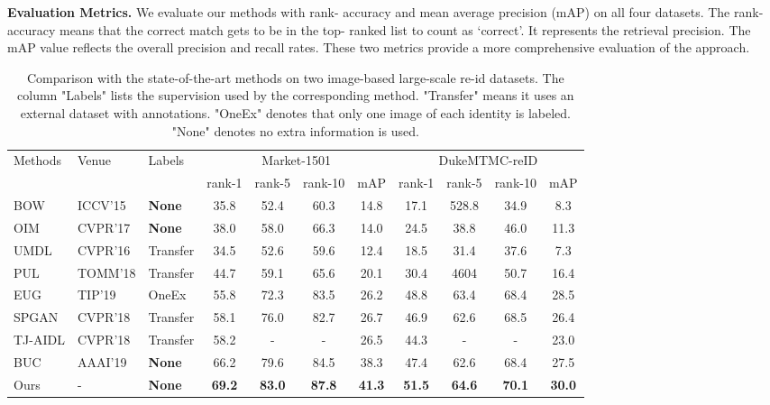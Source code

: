 \documentclass[journal]{IEEEtran}
\begin{document}
\textbf{Evaluation Metrics.} 
We evaluate our methods with rank- accuracy and mean average precision (mAP) on all four datasets. The rank- accuracy means that the correct match gets to be in the top- ranked list to count as `correct'. It represents the retrieval precision. The mAP value reflects the overall precision and recall rates. These two metrics provide a more comprehensive evaluation of the approach.

\begin{table*}[htb]
\caption{Comparison with the state-of-the-art methods on two image-based large-scale re-id datasets. The column "Labels" lists the supervision used by the corresponding method. "Transfer" means it uses an external dataset with annotations. "OneEx" denotes that only one image of each identity is labeled. "None" denotes no extra information is used.}
\begin{center}
\label{tab:market_duke}

\begin{tabular}{l|l|l|cccc|cccc}
\hline
\multirow{2}{*}{Methods} & \multirow{2}{*}{Venue} &\multirow{2}{*}{Labels}& \multicolumn{4}{c|}{Market-1501} & \multicolumn{4}{c}{DukeMTMC-reID} \\\cline{4-11}
 & & & rank-1 & rank-5 & rank-10 & mAP & rank-1 & rank-5 & rank-10 & mAP \\\hline
BOW\cite{zheng2015scalable} & ICCV'15 & \textbf{None} & 35.8 & 52.4 & 60.3 & 14.8 & 17.1 & 528.8 & 34.9 & 8.3 \\
OIM\cite{xiao2017joint}  & CVPR'17 & \textbf{None} & 38.0 & 58.0 & 66.3 & 14.0 & 24.5 & 38.8 & 46.0 & 11.3 \\
UMDL\cite{peng2016unsupervised} & CVPR'16 & Transfer & 34.5 & 52.6 & 59.6 & 12.4 & 18.5 & 31.4 & 37.6 & 7.3 \\
PUL\cite{fan2018unsupervised} & TOMM'18 & Transfer & 44.7 & 59.1 & 65.6 & 20.1 & 30.4 & 4604 & 50.7 & 16.4 \\
EUG\cite{wu2019progressive} & TIP'19 & OneEx & 55.8 & 72.3 & 83.5 & 26.2 & 48.8 & 63.4 & 68.4 & 28.5 \\
SPGAN\cite{deng2018image} & CVPR'18 & Transfer & 58.1 & 76.0 & 82.7 & 26.7 & 46.9 & 62.6 & 68.5 & 26.4 \\
TJ-AIDL\cite{wang2018transferable} & CVPR'18 & Transfer & 58.2 & - & - & 26.5 & 44.3 & - & - & 23.0 \\
BUC\cite{lin2019bottom} & AAAI'19 & \textbf{None} & 66.2 & 79.6 & 84.5 & 38.3 & 47.4 & 62.6 & 68.4 & 27.5 \\\hline
Ours & - & \textbf{None} & \textbf{69.2} & \textbf{83.0} & \textbf{87.8} & \textbf{41.3} & \textbf{51.5} & \textbf{64.6} & \textbf{70.1} & \textbf{30.0} \\
\hline
\end{tabular}
\end{center}
\end{table*} 
\end{document}
